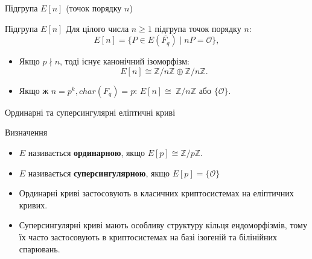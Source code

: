 \documentclass[9pt]{beamer}
\begin{document}
\begin{darkframes}
 \begin{frame}{Підгрупа \(E[n]\) (точок порядку \(n\))}
  \begin{block}{Підгрупа \(E[n]\)}
    Для цілого числа \(n \ge 1\) підгрупа точок порядку $n$:
    \[
    E[n] = \{ P \in E(\overline{F_q}) \mid nP = \mathcal{O} \},
    \]
  \end{block}
  \vspace{0.3cm}
  \begin{itemize}
    \item Якщо \(p \nmid n\), тоді існує канонічний ізоморфізм:
      \[
      E[n] \cong \mathbb{Z}/n\mathbb{Z} \oplus \mathbb{Z}/n\mathbb{Z}.
      \]
    \item Якщо ж \(n=p^k, char(F_q)=p\): \(E[n] \cong\ \mathbb{Z}/n\mathbb{Z} \) або \( \{\mathcal{O}\} \).
  \end{itemize}
\end{frame}

\begin{frame}{Ординарні та суперсингулярні еліптичні криві}
  \begin{block}{Визначення}
    \begin{itemize}
      \item \(E\) називається \textbf{ординарною}, якщо 
        \(
        E[p] \cong \mathbb{Z}/p\mathbb{Z}.
        \)
      \item \(E\) називається \textbf{суперсингулярною}, якщо \(E[p] = \{\mathcal{O}\}\)
    \end{itemize}
  \end{block}
  \vspace{0.3cm}
  \begin{itemize}
    \item Ординарні криві застосовують в класичних криптосистемах на еліптичних кривих.
    \item Суперсингулярні криві мають особливу структуру кільця ендоморфізмів, тому їх часто застосовують в криптосистемах на базі ізогеній та білінійних спарювань.
  \end{itemize}
\end{frame}


\end{darkframes}
\end{document}
